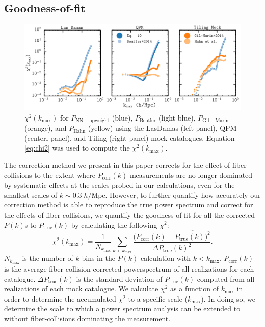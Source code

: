 \documentclass{emulateapj}
\begin{document}
\subsection{Goodness-of-fit} \label{sec:litcomp}
\begin{figure} 
\begin{center}
\includegraphics[scale=0.55]{fcpaper_pk_chisquared_comparison.png} 
\caption{$\chi^2 (k_\mathrm{max})$ for $P_\mathrm{NN-upweight}$ (blue), $P_\mathrm{Beutler}$ (light blue), $P_\mathrm{Gil-Marin}$ (orange), and $P_\mathrm{Hahn}$ (yellow) using the LasDamas (left panel), QPM (centerl panel), and Tiling (right panel) mock catalogues. Equation \ref{eq:chi2} was used to compute the $\chi^2(k_\mathrm{max})$. }\label{fig:peaksnchi2}
\end{center}
\end{figure}

The correction method we present in this paper corrects for the effect of fiber-collisions to the extent where $P_\mathrm{corr}(k)$ measurements are no longer dominated by systematic effects at the scales probed in our calculations, even for the smallest scales of $k \sim 0.3 \; h/\mathrm{Mpc}$. However, to further quantify how accurately our correction method is able to reproduce the true power spectrum and correct for the effects of fiber-collisions, we quantify the goodness-of-fit for all the corrected $P(k)$s to $P_\mathrm{true}(k)$ by calculating the following $\chi^2$: 
\begin{equation}
\chi^2 (k_\mathrm{max}) = \frac{1}{N_{k_\mathrm{max}}} \sum\limits_{k< k_\mathrm{max}} \frac{(\overline{P_\mathrm{corr}(k)} - \overline{P_\mathrm{true}(k))^2}}{\Delta P_\mathrm{true} (k)^2}. \label{eq:chi2}
\end{equation}
$N_{k_\mathrm{max}}$ is the number of $k$ bins in the $P(k)$ calculation with $k < k_\mathrm{max}$. $\overline{P_\mathrm{corr}(k)}$ is the average fiber-collision corrected powerspectrum of all realizations for each catalogue. $\Delta P_\mathrm{true}(k)$ is the standard deviation of $P_\mathrm{true}(k)$ computed from all realizations of each mock catalogue. We calculate $\chi^2$ as a function of $k_\mathrm{max}$ in order to determine the accumulated $\chi^2$ to a specific scale ($k_\mathrm{max}$). In doing so, we determine the scale to which a power spectrum analysis can be extended to without fiber-collisions dominating the measurement. 
\end{document}
